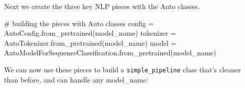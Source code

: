 \documentclass[
  letterpaper,
  DIV=11,
  numbers=noendperiod]{scrartcl}
\newenvironment{Shaded}{\begin{snugshade}}{\end{snugshade}}
\newcommand{\CommentTok}[1]{\textcolor[rgb]{0.37,0.37,0.37}{#1}}
\newcommand{\NormalTok}[1]{\textcolor[rgb]{0.00,0.23,0.31}{#1}}
\newcommand{\OperatorTok}[1]{\textcolor[rgb]{0.37,0.37,0.37}{#1}}
\begin{document}
Next we create the three key NLP pieces with the Auto classes.

\begin{Shaded}
\begin{Highlighting}[]
\CommentTok{\# building the pieces with \textasciigrave{}Auto\textasciigrave{} classes}
\NormalTok{config }\OperatorTok{=}\NormalTok{ AutoConfig.from\_pretrained(model\_name)}
\NormalTok{tokenizer }\OperatorTok{=}\NormalTok{ AutoTokenizer.from\_pretrained(model\_name)}
\NormalTok{model }\OperatorTok{=}\NormalTok{ AutoModelForSequenceClassification.from\_pretrained(model\_name)}
\end{Highlighting}
\end{Shaded}

We can now use these pieces to build a \texttt{simple\_pipeline} class
that's cleaner than before, and can handle any model\_name:
\end{document}
